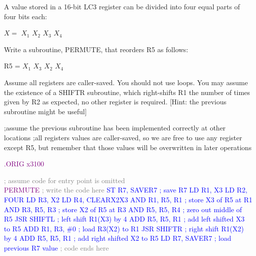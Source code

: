 \documentclass{article}
\begin{document}
\begin{enumerate}[label=(\alph*)]
   A value stored in a 16-bit LC3 register can be divided into four equal parts of four bits each:
    \begin{center}
        $X = $ $X_1$ $X_2$ $X_3$ $X_4$ \\
    \end{center}
Write a subroutine, PERMUTE, that reorders R5 as follows:
\begin{center}
R5 = $X_1$ $X_3$ $X_2$ $X_4$    
\end{center}

Assume all registers are caller-saved. You should not use loops. You may assume the existence of a SHIFTR subroutine, which right-shifts R1 the number of times given by R2 as expected, no other register is required. [Hint: the previous subroutine might be useful]

;assume the previous subroutine has been implemented correctly at other locations \newline
;all registers values are caller-saved, so we are free to use any register except R5, but remember that those values will be overwritten in later operations 


\textcolor{purple}{.ORIG x3100}

    \textcolor{gray}{; assume code for entry point is omitted}\\
 

    \textcolor{purple}{PERMUTE} \newline
    \textcolor{gray}{; write the code here} \newline
    \textcolor{blue}{ST R7, SAVER7 ; save R7}
    \newline
    \textcolor{blue}{LD R1, X3}
    \newline
    \textcolor{blue}{LD R2, FOUR}
    \newline
    \textcolor{blue}{LD R3, X2}
    \newline
    \textcolor{blue}{LD R4, CLEARX2X3}
    \newline
    \textcolor{blue}{AND R1, R5, R1 ; store X3 of R5 at R1}
    \newline
    \textcolor{blue}{AND R3, R5, R3 ; store X2 of R5 at R3}
    \newline
    \textcolor{blue}{AND R5, R5, R4 ; zero out middle  of R5}
    \newline
    \textcolor{blue}{JSR SHIFTL ; left shift R1(X3) by 4}
    \newline
    \textcolor{blue}{ADD R5, R5, R1 ; add left shifted X3 to R5}
    \newline
    \textcolor{blue}{ADD R1, R3, \#0 ; load R3(X2)  to R1}
    \newline
    \textcolor{blue}{JSR SHIFTR ; right shift R1(X2) by 4}
    \newline
    \textcolor{blue}{ADD R5, R5, R1 ; add right shifted X2 to R5}
    \newline
    \textcolor{blue}{LD R7, SAVER7 ; load previous R7 value}
    \newline
    \textcolor{gray}{; code ends here}
    

\end{enumerate}
\end{document}

